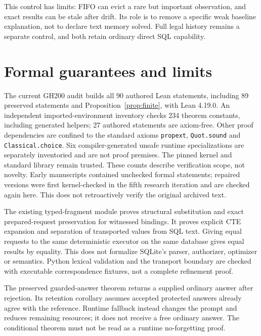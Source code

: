 \documentclass[10pt,twocolumn]{article}
\newcommand{\code}[1]{\texttt{\small #1}}
\begin{document}
This control has limits: FIFO can evict a rare but important observation, and
exact results can be stale after drift. Its role is to remove a specific weak
baseline explanation, not to declare text memory solved. Full legal history
remains a separate control, and both retain ordinary direct SQL capability.

\section{Formal guarantees and limits}
The current GH200 audit builds all 90 authored Lean statements, including
89 preserved statements and Proposition~\ref{prop:finite}, with Lean 4.19.0. An
independent imported-environment inventory checks 234 theorem constants,
including generated helpers; 27 authored statements are axiom-free. Other proof
dependencies are confined to the standard axioms \code{propext},
\code{Quot.sound} and \code{Classical.choice}. Six compiler-generated unsafe
runtime specializations are separately inventoried and are not proof premises.
The pinned kernel and standard library remain trusted. These counts describe
verification scope, not novelty. Early manuscripts contained unchecked formal
statements; repaired versions were first kernel-checked in the fifth research
iteration and are checked again here. This does not retroactively verify the
original archived text.

The existing typed-fragment module proves structural substitution and exact
prepared-request preservation for witnessed bindings. It proves explicit CTE
expansion and separation of transported values from SQL text. Giving equal
requests to the same deterministic executor on the same database gives equal
results by equality. This does not formalize SQLite's parser, authorizer,
optimizer or semantics. Python lexical validation and the transport boundary
are checked with executable correspondence fixtures, not a complete refinement
proof.

The preserved guarded-answer theorem returns a supplied ordinary answer after
rejection. Its retention corollary assumes accepted protected answers already
agree with the reference. Runtime fallback instead changes the prompt and
reduces remaining resources; it does not receive a free ordinary answer. The
conditional theorem must not be read as a runtime no-forgetting proof.
\end{document}

